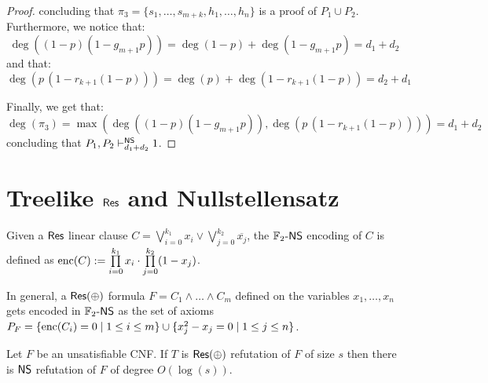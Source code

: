 \begin{proof}
    concluding that $\pi_3 = \{s_1, \ldots, s_{m+k}, h_1, \ldots, h_n\}$ is a proof of $P_1 \cup P_2$. Furthermore, we notice that:
    \[\deg((1-p)(1-g_{m+1}p)) = \deg(1-p) + \deg(1-g_{m+1}p) = d_1 + d_2\]
    and that:
    \[\deg(p\,(1-r_{k+1}(1-p))) = \deg(p) + \deg(1-r_{k+1}(1-p)) = d_2 + d_1\]

    Finally, we get that:
    \[\deg(\pi_3) = \max(\deg((1-p)(1-g_{m+1}p)), \deg(p\,(1-r_{k+1}(1-p)))) = d_1 + d_2\]
    concluding that $P_1, P_2 \vdash_{d_1+d_2}^{\mathsf{NS}} 1$.

\end{proof}

\newpage

\section{Treelike $\mathsf{Res}$ and Nullstellensatz}

\begin{definition}
    Given a $\mathsf{Res}$ linear clause $C = \bigvee\limits_{i = 0}^{k_1} x_i \lor  \bigvee\limits_{j = 0}^{k_2} \overline{x_j}$, the $\mathbb{F}_2\text{-}\mathsf{NS}$ encoding of $C$ is defined as $\mathrm{enc}(C) := \prod\limits_{i = 0}^{k_1} x_i \cdot \prod\limits_{j = 0}^{k_2} (1-x_j)$.
    
    In general, a $\mathsf{Res(\oplus)}$ formula $F = C_1 \land \ldots \land C_m$ defined on the variables $x_1, \ldots, x_n$ gets encoded in $\mathbb{F}_2\text{-}\mathsf{NS}$ as the set of axioms $P_F = \{\mathrm{enc}(C_i) = 0 \mid 1 \leq i \leq m\} \cup \{x_j^2-x_j = 0 \mid 1 \leq j \leq n\}$.
\end{definition}

\begin{theorem}
    Let $F$ be an unsatisfiable CNF. If $T$ is $\mathsf{Res(\oplus)}$ refutation of $F$ of size $s$ then there is $\mathsf{NS}$ refutation of $F$ of degree $O(\log(s))$.
\end{theorem}

